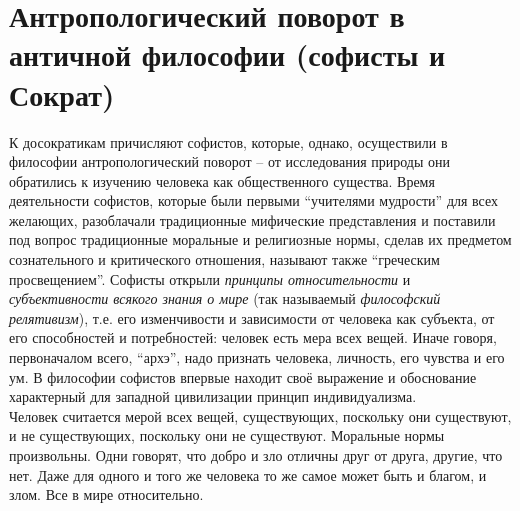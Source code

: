 \documentclass[12pt]{article}
\begin{document}
\newpage
\section{Антропологический поворот в античной философии (софисты и Сократ)}
К досократикам причисляют софистов, которые, однако, осуществили в философии антропологический поворот
– от исследования природы они обратились к изучению человека как общественного существа. Время
деятельности софистов, которые были первыми “учителями мудрости” для всех желающих, разоблачали
традиционные мифические представления и поставили под вопрос традиционные моральные и религиозные
нормы, сделав их предметом сознательного и критического отношения, называют также “греческим
просвещением”. Софисты открыли \textit{принципы относительности} и \textit{субъективности всякого знания о мире}
(так называемый \textit{философский релятивизм}), т.е. его изменчивости и зависимости от человека как субъекта, от его
способностей и потребностей: человек есть мера всех вещей. Иначе говоря, первоначалом всего, “архэ”, надо
признать человека, личность, его чувства и его ум. В философии софистов впервые находит своё выражение и
обоснование характерный для западной цивилизации принцип индивидуализма.\\
Человек считается мерой всех вещей, существующих, поскольку они существуют, и не существующих, поскольку они не существуют. Моральные нормы произвольны. Одни говорят, что добро и зло отличны друг от друга, другие, что нет. Даже для одного и того же человека то же самое может быть и благом, и злом. Все в мире относительно.
\end{document}
